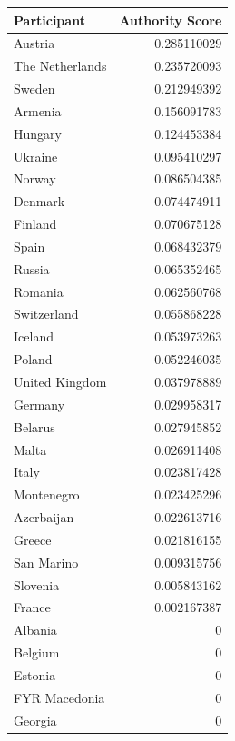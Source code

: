 \documentclass[a4paper,11pt]{report}
\begin{document}
\begin{table}[h!]
  \centering

\begin{tabular}{l | r}
\textbf{Participant}     & \textbf{Authority Score}\\\hline 
Austria         & 0.285110029     \\
The Netherlands & 0.235720093     \\
Sweden          & 0.212949392     \\
Armenia         & 0.156091783     \\
Hungary         & 0.124453384     \\
Ukraine         & 0.095410297     \\
Norway          & 0.086504385     \\
Denmark         & 0.074474911     \\
Finland & 0.070675128     \\
Spain           & 0.068432379     \\
Russia          & 0.065352465     \\
Romania         & 0.062560768     \\
Switzerland     & 0.055868228     \\
Iceland         & 0.053973263     \\
Poland          & 0.052246035     \\
United Kingdom  & 0.037978889     \\
Germany         & 0.029958317     \\
Belarus         & 0.027945852     \\
Malta           & 0.026911408     \\
Italy           & 0.023817428     \\
Montenegro      & 0.023425296     \\
Azerbaijan      & 0.022613716     \\
Greece          & 0.021816155     \\
San Marino      & 0.009315756     \\
Slovenia        & 0.005843162     \\
France  & 0.002167387     \\
Albania         & 0               \\
Belgium         & 0               \\
Estonia         & 0               \\
FYR Macedonia   & 0               \\
Georgia         & 0               \\

\end{tabular}
\end{table}
\end{document}
